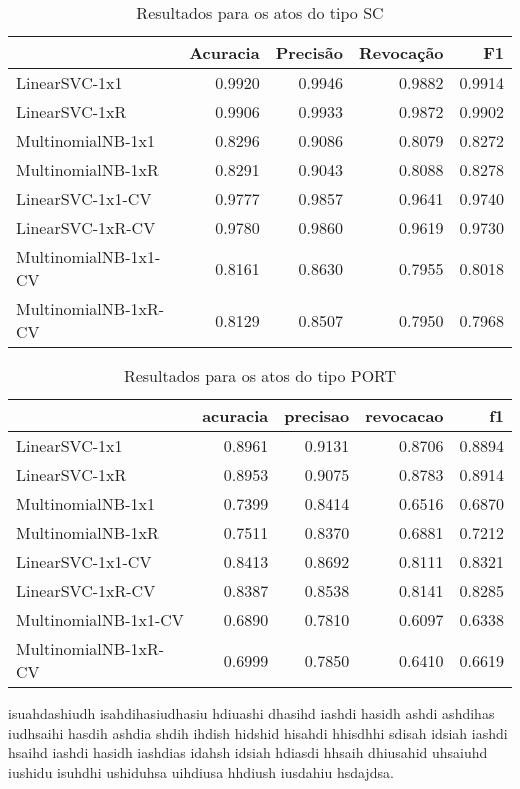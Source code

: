 \begin{table}[h]
\caption{Resultados para os atos do tipo SC}
\label{tab:resultados-sc}
	\begin{center}
	\begin{tabular}{lrrrr}
		\toprule
		{} &  Acuracia &  Precisão &  Revocação &      F1 \\
		\midrule
		LinearSVC-1x1        &    0.9920 &    0.9946 &     0.9882 &  0.9914 \\
		LinearSVC-1xR        &    0.9906 &    0.9933 &     0.9872 &  0.9902 \\
		MultinomialNB-1x1    &    0.8296 &    0.9086 &     0.8079 &  0.8272 \\
		MultinomialNB-1xR    &    0.8291 &    0.9043 &     0.8088 &  0.8278 \\
		LinearSVC-1x1-CV     &    0.9777 &    0.9857 &     0.9641 &  0.9740 \\
		LinearSVC-1xR-CV     &    0.9780 &    0.9860 &     0.9619 &  0.9730 \\
		MultinomialNB-1x1-CV &    0.8161 &    0.8630 &     0.7955 &  0.8018 \\
		MultinomialNB-1xR-CV &    0.8129 &    0.8507 &     0.7950 &  0.7968 \\
		\bottomrule
	\end{tabular}
	\end{center}		
\end{table}

\begin{table}[h]
\caption{Resultados para os atos do tipo PORT}
\label{tab:resultados-port}
	\begin{center}
	\begin{tabular}{lrrrr}
		\toprule
		{} &  acuracia &  precisao &  revocacao &      f1 \\
		\midrule
		LinearSVC-1x1        &    0.8961 &    0.9131 &     0.8706 &  0.8894 \\
		LinearSVC-1xR        &    0.8953 &    0.9075 &     0.8783 &  0.8914 \\
		MultinomialNB-1x1    &    0.7399 &    0.8414 &     0.6516 &  0.6870 \\
		MultinomialNB-1xR    &    0.7511 &    0.8370 &     0.6881 &  0.7212 \\
		LinearSVC-1x1-CV     &    0.8413 &    0.8692 &     0.8111 &  0.8321 \\
		LinearSVC-1xR-CV     &    0.8387 &    0.8538 &     0.8141 &  0.8285 \\
		MultinomialNB-1x1-CV &    0.6890 &    0.7810 &     0.6097 &  0.6338 \\
		MultinomialNB-1xR-CV &    0.6999 &    0.7850 &     0.6410 &  0.6619 \\
		\bottomrule
	\end{tabular}
	\end{center}		
\end{table}

isuahdashiudh isahdihasiudhasiu hdiuashi dhasihd iashdi hasidh ashdi ashdihas iudhsaihi hasdih ashdia shdih ihdish hidshid hisahdi hhisdhhi sdisah idsiah iashdi hsaihd iashdi hasidh iashdias idahsh idsiah hdiasdi hhsaih dhiusahid uhsaiuhd iushidu isuhdhi ushiduhsa uihdiusa hhdiush iusdahiu hsdajdsa.